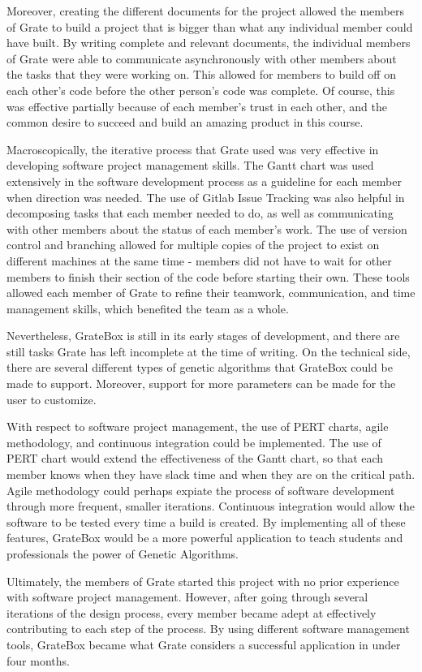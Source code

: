 \documentclass{article}
\begin{document}
\textcolor{RoyalPurple}{Moreover, creating the different documents for the 
project 
allowed the members 
of Grate to build a project that is bigger than what any individual member could 
have built. By writing complete and relevant documents, the individual members 
of Grate were able to  communicate asynchronously with other members about the 
tasks that they were working on. This allowed for members to build off on each 
other's code before the other person's code was complete. Of course, this was 
effective partially because of each member's trust in each other, and the common 
desire to succeed and build an amazing product in this course.}

\textcolor{RoyalPurple}{Macroscopically, the iterative process that Grate used 
was very 
effective in 
developing software project management skills. The Gantt chart was used 
extensively in the software development process as a guideline for each member 
when direction was needed. The use of Gitlab Issue Tracking was also helpful in 
decomposing tasks that each member needed to do, as well as communicating with 
other members about the status of each member's work. The use of version control 
and branching allowed for multiple copies of the project to exist on different 
machines at the same time - members did not have to wait for other members to 
finish their section of the code before starting their own. These tools allowed 
each member of Grate to refine their teamwork, communication, and time 
management skills, which benefited the team as a whole.}

\textcolor{RoyalPurple}{Nevertheless, GrateBox is still in its early stages of 
development, and there 
are still tasks Grate has left incomplete at the time of writing. On the 
technical side, there are several different types of genetic algorithms that 
GrateBox could be made to support. Moreover, support for more parameters can be 
made for the user to customize. }

\textcolor{RoyalPurple}{With respect to software project management, the use of 
PERT 
charts, agile 
methodology, and continuous integration could be implemented. The use of PERT 
chart would extend the effectiveness of the Gantt chart, so that each member 
knows when they have slack time and when they are on the critical path. Agile 
methodology could perhaps expiate the process of software development through 
more frequent, smaller iterations. Continuous integration would allow the 
software to be tested every time a build is created. By implementing all of 
these features, GrateBox would be a more powerful application to teach students 
and professionals the power of Genetic Algorithms.}

\textcolor{RoyalPurple}{Ultimately, the members of Grate started this project 
with no 
prior experience 
with software project management. However, after going through several 
iterations of the design process, every member became adept at effectively 
contributing to each step of the process. By using different software management 
tools, GrateBox became what Grate considers a successful application in under 
four months.}
\end{document}
